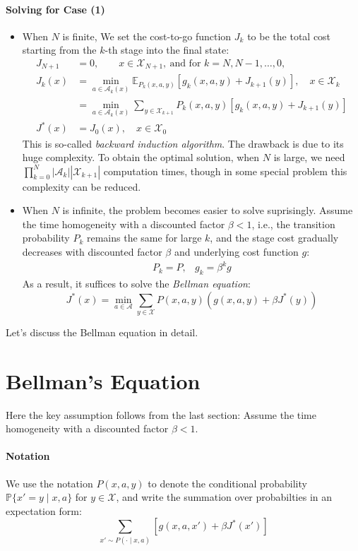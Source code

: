 \paragraph{Solving for Case (1)}
\begin{itemize}
\item
When $N$ is finite, We set the cost-to-go function $J_k$ to be the total cost starting from the $k$-th stage into the final state:
\begin{align*}
J_{N+1}&=0,\qquad x\in\mathcal{X}_{N+1}, \ \text{and for }k=N,N-1,\dots,0,\\
J_k(x)&=\min_{a\in\mathcal{A}_k(x)}\mathbb{E}_{P_k(x,a,y)}\left[g_k(x,a,y)+J_{k+1}(y)\right],\quad x\in\mathcal{X}_k\\
&=\min_{a\in\mathcal{A}_k(x)}\sum_{y\in\mathcal{X}_{k+1}}
P_k(x,a,y)
\left[
g_k(x,a,y)+J_{k+1}(y)
\right]\\
J^*(x)&=J_0(x),\quad x\in\mathcal{X}_0
\end{align*}
This is so-called \emph{backward induction algorithm}. The drawback is due to its huge complexity. To obtain the optimal solution, when $N$ is large, we need $\prod_{k=0}^N|\mathcal{A}_k||\mathcal{X}_{k+1}|$ computation times, though in some special problem this complexity can be reduced.
\item
When $N$ is infinite, the problem becomes easier to solve suprisingly. Assume the time homogeneity with a discounted factor $\beta<1$, i.e., the transition probability $P_k$ remains the same for large $k$, and the stage cost gradually decreases with discounted factor $\beta$ and underlying cost function $g$:
\[
\begin{array}{ll}
P_k=P,
&
g_k=\beta^kg
\end{array}
\]
As a result, it suffices to solve the \emph{Bellman equation}:
\begin{equation}
J^*(x)=\min_{a\in\mathcal{A}}\sum_{y\in\mathcal{X}}P(x,a,y)\left(
g(x,a,y)+\beta J^*(y)
\right)
\end{equation}
\end{itemize}
Let's discuss the Bellman equation in detail.

\section{Bellman's Equation}
Here the key assumption follows from the last section: Assume the time homogeneity with a discounted factor $\beta<1$.
\paragraph{Notation}
We use the notation $P(x,a,y)$ to denote the conditional probability $\mathbb{P}\{x'=y\mid x,a\}$ for $y\in\mathcal{X}$, and write the summation over probabilties in an expectation form:
\[
\sum_{x'\sim P(\cdot\mid x,a)}
\left[
g(x,a,x')+\beta J^*(x')
\right]
\]

